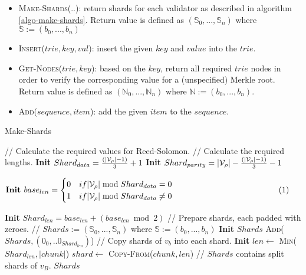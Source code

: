 \begin{itemize}
  \item \textsc{Make-Shards(..)}: return shards for each validator as described
  in algorithm \ref{algo-make-shards}. Return value is defined as
  $(\mathbb{S}_0,...,\mathbb{S}_n)$ where $\mathbb{S} := (b_0,...,b_n)$
  \item \textsc{Insert($trie,key,val$)}: insert the given $key$ and $value$ into
  the $trie$.
  \item \textsc{Get-Nodes($trie,key$)}: based on the $key$, return all required
  $trie$ nodes in order to verify the corresponding value for a (unspecified)
  Merkle root. Return value is defined as $(\mathbb{N}_0,...,\mathbb{N}_n)$
  where $\mathbb{N} := (b_0,...,b_n)$.
  \item \textsc{Add($sequence, item$)}: add the given $item$ to the $sequence$.
\end{itemize}

\begin{algorithm}[H]
  \caption[]{\sc Make-Shards}
  \label{algo-make-shards}
  \begin{algorithmic}[1]
    \Statex // Calculate the required values for Reed-Solomon.
    \Statex // Calculate the required lengths.
    \State \textbf{Init} $Shard_{data} = \frac{(|\mathcal{V}_\rho| - 1)}{3} + 1$
    \State \textbf{Init} $Shard_{parity} = |\mathcal{V}_\rho| - \frac{(|\mathcal{V}_\rho| - 1)}{3} - 1$
    \State $\vcenter{
      \begin{flalign*}
        &\textbf{Init } base_{len} =
        \begin{cases}
          0 & if |\paraValidSet| \bmod{Shard_{data}} = 0 \\
          1 & if |\paraValidSet| \bmod{Shard_{data}} \neq 0
        \end{cases}&
      \end{flalign*}
    }$
    \State \textbf{Init} $Shard_{len} = base_{len} + (base_{len} \bmod{2})$
    \Statex
    \Statex // Prepare shards, each padded with zeroes.
    \Statex // $Shards := (\mathbb{S}_0,...,\mathbb{S}_n)$ where $\mathbb{S} := (b_0,...,b_n)$
    \State \textbf{Init} $Shards$
      \State \textsc{Add}($Shards, (0_0, ..0_{Shard_{len}})$)
    \EndFor
    \Statex
    \Statex // Copy shards of $v_b$ into each shard.
      \State \textbf{Init} $len \leftarrow$ \textsc{Min}($Shard_{len}, |chunk|$)
      \State $shard \leftarrow$ \textsc{Copy-From}($chunk, len$)
    \EndFor
    \Statex
    \Statex // $Shards$ contains split shards of $v_B$.
    \State \Return $Shards$
  \end{algorithmic}
\end{algorithm}

